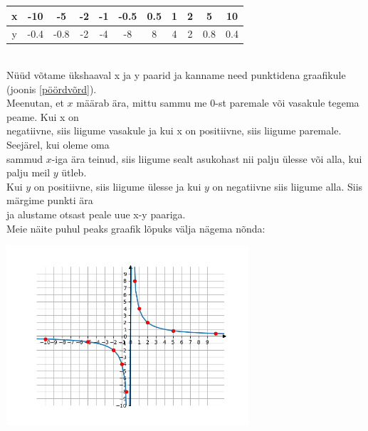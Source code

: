 \begin{center}
{{{\begin{flushleft}
\vspace{2mm}
\hspace{5mm}
\begin{tabular}{c|c|c|c|c|c|c|c|c|c|c}
     x & -10 & -5 & -2 & -1 & -0.5 & 0.5 & 1 & 2 & 5 & 10 \\
     \hline
     y & -0.4 & -0.8 & -2 & -4 & -8 & 8 & 4 & 2 & 0.8 & 0.4
\end{tabular}\\
\vspace{2mm}
\hspace{5mm}
Nüüd võtame ükshaaval x ja y paarid ja kanname need punktidena graafikule (joonis \ref{pöördvõrd}).\\
\hspace{5mm} Meenutan, et $x$ määrab ära, mittu sammu me $0$-st paremale või vasakule tegema peame. Kui x on\\ \hspace{5mm} negatiivne, siis liigume vasakule ja kui x on positiivne, siis liigume paremale. Seejärel, kui oleme oma\\ \hspace{5mm} sammud $x$-iga ära teinud, siis liigume sealt asukohast nii palju ülesse või alla, kui palju meil $y$ ütleb.\\ \hspace{5mm} Kui $y$ on positiivne, siis liigume ülesse ja kui $y$ on negatiivne siis liigume alla. Siis märgime punkti ära\\ \hspace{5mm} ja alustame otsast peale uue x-y paariga.\\
\vspace{2mm}
\hspace{5mm} Meie näite puhul peaks graafik lõpuks välja nägema nõnda:\\
\begin{center}
    \includegraphics[width=9cm]{pöördvõrdeline.png}

\end{center}
\end{flushleft}}}}
\end{center}
